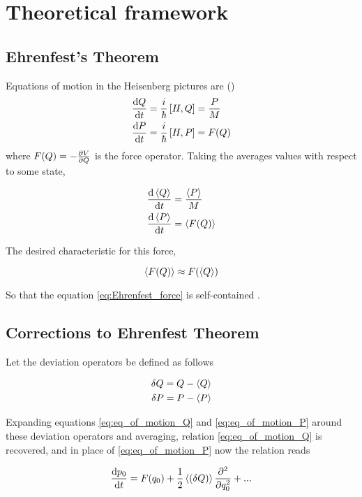 \chapter{Theoretical framework}

\section{Ehrenfest's Theorem}

Equations of motion in the Heisenberg pictures are (\cite{ballentineQuantumMechanicsModern2010})
\begin{align}
    \frac{\text d Q}{\text d t} &= \dfrac{i}{\hbar} \left[H, Q\right] = \dfrac{P}{M} \label{eq:eq_of_motion_Q}\\
    \frac{\text d P}{\text d t} &= \dfrac{i}{\hbar} \left[H, P\right] = F(Q) \label{eq:eq_of_motion_P}
\end{align}
where $F(Q) = -\frac{\partial V}{\partial Q}$ is the force operator. 
Taking the averages values with respect to some state, 

\begin{align}
    \frac{\text d \left\langle Q \right\rangle}{\text d t} &= \dfrac{\left\langle P \right\rangle}{M} \\
    \frac{\text d \left\langle P \right\rangle}{\text d t} &= \left\langle F(Q) \right\rangle \label{eq:Ehrenfest_force}
\end{align}

The desired characteristic for this force, 

\begin{equation}
    \left\langle F(Q) \right\rangle \approx F(\left\langle Q \right\rangle) 
\end{equation}

So that the equation \eqref{eq:Ehrenfest_force} is self-contained \cite{manfrediQuantumSystemsThat1993}.

\section{Corrections to Ehrenfest Theorem}
\label{sec:Ehrenfest_corrections}
Let the deviation operators be defined as follows

\begin{align}
    \delta Q = Q - \left\langle Q \right\rangle\\
    \delta P = P - \left\langle P \right\rangle
\end{align}

Expanding equations \eqref{eq:eq_of_motion_Q} and \eqref{eq:eq_of_motion_P} around these deviation operators and averaging, relation \eqref{eq:eq_of_motion_Q} is recovered, and in place of \eqref{eq:eq_of_motion_P} now the relation reads

\begin{equation}
    \frac{\text d p_0}{\text d t} = F(q_0) + \dfrac{1}{2}\left\langle (\delta Q) \right\rangle\frac{\partial ^2}{\partial q_0^2} + ...
\end{equation}

